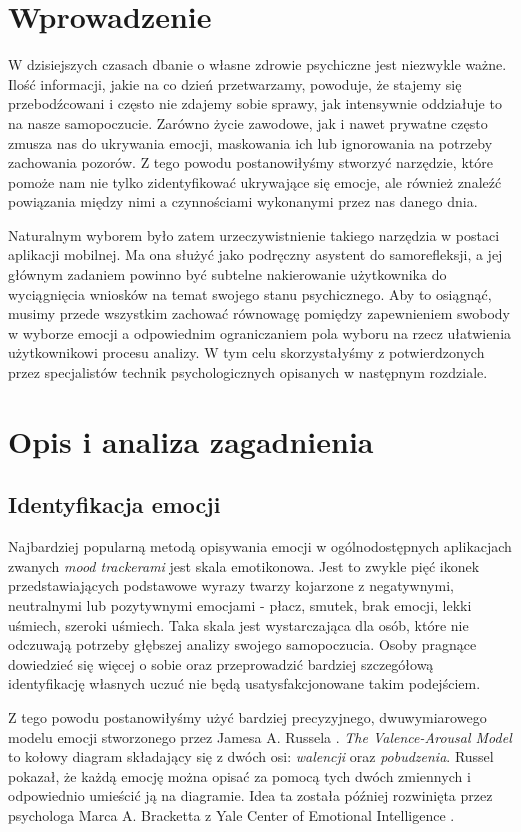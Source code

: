 \documentclass[inz, shortabstract]{iithesis}
\author         {Aleksandra Nicpoń \and Martyna Wybraniec}
\begin{document}

\chapter{Wprowadzenie}
W dzisiejszych czasach dbanie o własne zdrowie psychiczne jest niezwykle ważne. Ilość informacji, jakie na co dzień przetwarzamy, powoduje, że stajemy się przebodźcowani i często nie zdajemy sobie sprawy, jak intensywnie oddziałuje to na nasze samopoczucie. Zarówno życie zawodowe, jak i nawet prywatne często zmusza nas do ukrywania emocji, maskowania ich lub ignorowania na potrzeby zachowania pozorów. Z tego powodu postanowiłyśmy stworzyć narzędzie, które pomoże nam nie tylko zidentyfikować ukrywające się emocje, ale również znaleźć powiązania między nimi a czynnościami wykonanymi przez nas danego dnia.

Naturalnym wyborem było zatem urzeczywistnienie takiego narzędzia w postaci aplikacji mobilnej. Ma ona służyć jako podręczny asystent do samorefleksji, a jej głównym zadaniem powinno być subtelne nakierowanie użytkownika do wyciągnięcia wniosków na temat swojego stanu psychicznego. Aby to osiągnąć, musimy przede wszystkim zachować równowagę pomiędzy zapewnieniem swobody w wyborze emocji a odpowiednim ograniczaniem pola wyboru na rzecz ułatwienia użytkownikowi procesu analizy. W tym celu skorzystałyśmy z potwierdzonych przez specjalistów technik psychologicznych opisanych w następnym rozdziale.

\chapter{Opis i analiza zagadnienia}
\section{Identyfikacja emocji}
Najbardziej popularną metodą opisywania emocji w ogólnodostępnych aplikacjach zwanych \textit{mood trackerami} jest skala emotikonowa. Jest to zwykle pięć ikonek przedstawiających podstawowe wyrazy twarzy kojarzone z negatywnymi, neutralnymi lub pozytywnymi emocjami - płacz, smutek, brak emocji, lekki uśmiech, szeroki uśmiech. Taka skala jest wystarczająca dla osób, które nie odczuwają potrzeby głębszej analizy swojego samopoczucia. Osoby pragnące dowiedzieć się więcej o sobie oraz przeprowadzić bardziej szczegółową identyfikację własnych uczuć nie będą usatysfakcjonowane takim podejściem. 

Z tego powodu postanowiłyśmy użyć bardziej precyzyjnego, dwuwymiarowego modelu emocji stworzonego przez Jamesa A. Russela \cite{russel}. \textit{The Valence-Arousal Model} to kołowy diagram składający się z dwóch osi: \textit{walencji} oraz \textit{pobudzenia}. Russel pokazał, że każdą emocję można opisać za pomocą tych dwóch zmiennych i odpowiednio umieścić ją na diagramie. Idea ta została później rozwinięta przez psychologa Marca A. Bracketta z Yale Center of Emotional Intelligence \cite{brackett}.
\end{document}
